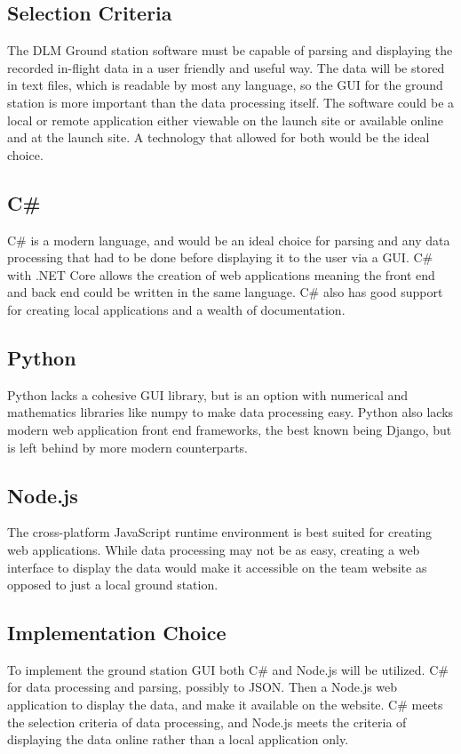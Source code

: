 \documentclass[onecolumn, draftclsnofoot,10pt, compsoc]{IEEEtran}
\begin{document}
\subsection{Selection Criteria}
The DLM Ground station software must be capable of parsing and displaying the recorded in-flight data in a user friendly and useful way. The data will be stored in text files, which is readable by most any language, so the GUI for the ground station is more important than the data processing itself. The software could be a local or remote application either viewable on the launch site or available online and at the launch site. A technology that allowed for both would be the ideal choice.
\subsection{C\#}
C\# is a modern language, and would be an ideal choice for parsing and any data processing that had to be done before displaying it to the user via a GUI. C\# with .NET Core allows the creation of web applications meaning the front end and back end could be written in the same language. C\# also has good support for creating local applications and a wealth of documentation.
\subsection{Python}
Python lacks a cohesive GUI library, but is an option with numerical and mathematics libraries like numpy to make data processing easy. Python also lacks modern web application front end frameworks, the best known being Django, but is left behind by more modern counterparts.
\subsection{Node.js}
The cross-platform JavaScript runtime environment is best suited for creating web applications. While data processing may not be as easy, creating a web interface to display the data would make it accessible on the team website as opposed to just a local ground station.
\subsection{Implementation Choice}
To implement the ground station GUI both C\# and Node.js will be utilized. C\# for data processing and parsing, possibly to JSON. Then a Node.js web application to display the data, and make it available on the website. C\# meets the selection criteria of data processing, and Node.js meets the criteria of displaying the data online rather than a local application only.
\newpage
\nocite{*}%


\end{document}
